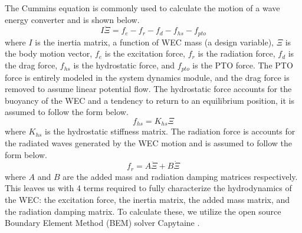 \documentclass[twocolumn,10pt]{asme2e}
\begin{document}
The Cummins equation is commonly used to calculate the motion of a wave energy converter and is shown below.
\begin{equation}
    \label{eq:cummins}
    I\ddot{\Xi} = f_e - f_r - f_d - f_{hs} - f_{pto}  
\end{equation}
where $I$ is the inertia matrix, a function of WEC mass (a design variable), $\Xi$ is the body motion vector, $f_e$ is the excitation force, $f_r$ is the radiation force, $f_d$ is the drag force, $f_{hs}$ is the hydrostatic force, and $f_{pto}$ is the PTO force. The PTO force is entirely modeled in the system dynamics module, and the drag force is removed to assume linear potential flow. The hydrostatic force accounts for the buoyancy of the WEC and a tendency to return to an equilibrium position, it is assumed to follow the form below.
\begin{equation}
    \label{eq:hydrostatic}
    f_{hs} = K_{hs} \Xi
\end{equation}
where $K_{hs}$ is the hydrostatic stiffness matrix. The radiation force is accounts for the radiated waves generated by the WEC motion and is assumed to follow the form below.
\begin{equation}
    \label{eq:radiation}
    f_r = A \ddot{\Xi} + B \dot{\Xi}
\end{equation}
where $A$ and $B$ are the added mass and radiation damping matrices respectively. This leaves us with 4 terms required to fully characterize the hydrodynamics of the WEC: the excitation force, the inertia matrix, the added mass matrix, and the radiation damping matrix. To calculate these, we utilize the open source Boundary Element Method (BEM) solver Capytaine \cite{ancellin_capytaine_2019}. 


\end{document}
